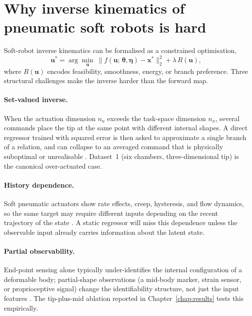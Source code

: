 \section{Why inverse kinematics of pneumatic soft robots is hard}
\label{sec:bg_ik_hard}

Soft-robot inverse kinematics can be formalised as a constrained optimisation,
\begin{equation}
  \mathbf{u}^{\ast} = \arg\min_{\mathbf{u}}\; \| f(\mathbf{u};\, \boldsymbol{\theta}, \boldsymbol{\eta}) - \mathbf{x}^{\ast} \|_{2}^{2} + \lambda\, R(\mathbf{u}),
  \label{eq:bg_ik_obj}
\end{equation}
where $R(\mathbf{u})$ encodes feasibility, smoothness, energy, or branch preference. Three structural challenges make the inverse harder than the forward map.

\paragraph{Set-valued inverse.}
When the actuation dimension $n_{u}$ exceeds the task-space dimension $n_{x}$, several commands place the tip at the same point with different internal shapes. A direct regressor trained with squared error is then asked to approximate a single branch of a relation, and can collapse to an averaged command that is physically suboptimal or unrealisable \cite{wang2021mlsurvey, giorelli2015nn, fang2022jacobian}. Dataset~1 (six chambers, three-dimensional tip) is the canonical over-actuated case.

\paragraph{History dependence.}
Soft pneumatic actuators show rate effects, creep, hysteresis, and flow dynamics, so the same target may require different inputs depending on the recent trajectory of the state \cite{thuruthel2018survey, thuruthel2019modelbased, tariverdi2021rnn}. A static regressor will miss this dependence unless the observable input already carries information about the latent state.

\paragraph{Partial observability.}
End-point sensing alone typically under-identifies the internal configuration of a deformable body; partial-shape observations (a mid-body marker, strain sensor, or proprioceptive signal) change the identifiability structure, not just the input features \cite{sincak2024sensing, wang2024proprioception}. The tip-plus-mid ablation reported in Chapter~\ref{chap:results} tests this empirically.

